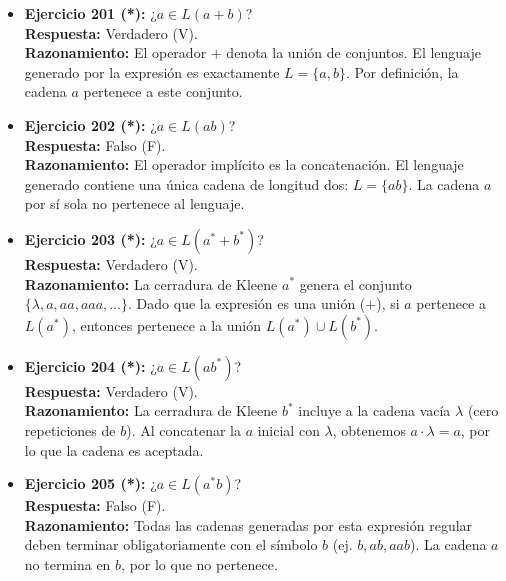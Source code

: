 \documentclass[12pt]{article}
\begin{document}
\vspace{0.5cm}

\begin{itemize}
    \item \textbf{Ejercicio 201 (*):} ¿$a \in L(a+b)$? \\
    \textbf{Respuesta:} Verdadero (V). \\
    \textbf{Razonamiento:} El operador $+$ denota la unión de conjuntos. El lenguaje generado por la expresión es exactamente $L = \{a, b\}$. Por definición, la cadena $a$ pertenece a este conjunto.
    
    \vspace{0.2cm}
    \item \textbf{Ejercicio 202 (*):} ¿$a \in L(ab)$? \\
    \textbf{Respuesta:} Falso (F). \\
    \textbf{Razonamiento:} El operador implícito es la concatenación. El lenguaje generado contiene una única cadena de longitud dos: $L = \{ab\}$. La cadena $a$ por sí sola no pertenece al lenguaje.
    
    \vspace{0.2cm}
    \item \textbf{Ejercicio 203 (*):} ¿$a \in L(a^*+b^*)$? \\
    \textbf{Respuesta:} Verdadero (V). \\
    \textbf{Razonamiento:} La cerradura de Kleene $a^*$ genera el conjunto $\{\lambda, a, aa, aaa, \dots\}$. Dado que la expresión es una unión ($+$), si $a$ pertenece a $L(a^*)$, entonces pertenece a la unión $L(a^*) \cup L(b^*)$.
    
    \vspace{0.2cm}
    \item \textbf{Ejercicio 204 (*):} ¿$a \in L(ab^*)$? \\
    \textbf{Respuesta:} Verdadero (V). \\
    \textbf{Razonamiento:} La cerradura de Kleene $b^*$ incluye a la cadena vacía $\lambda$ (cero repeticiones de $b$). Al concatenar la $a$ inicial con $\lambda$, obtenemos $a \cdot \lambda = a$, por lo que la cadena es aceptada.
    
    \vspace{0.2cm}
    \item \textbf{Ejercicio 205 (*):} ¿$a \in L(a^*b)$? \\
    \textbf{Respuesta:} Falso (F). \\
    \textbf{Razonamiento:} Todas las cadenas generadas por esta expresión regular deben terminar obligatoriamente con el símbolo $b$ (ej. $b, ab, aab$). La cadena $a$ no termina en $b$, por lo que no pertenece.
    

\end{itemize}
\end{document}
